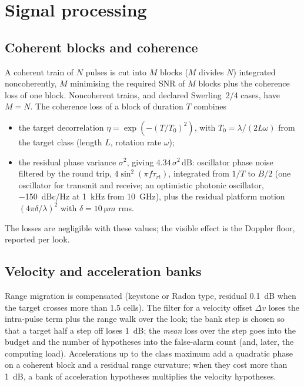 \documentclass[11pt,a4paper]{article}
\newcommand{\dB}{\,\mathrm{dB}}
\begin{document}
\section{Signal processing}\label{sec:proc}

\subsection{Coherent blocks and coherence}
A coherent train of $N$ pulses is cut into $M$ blocks ($M$ divides $N$) integrated noncoherently, $M$ minimising the
required SNR of $M$ blocks plus the coherence loss of one block. Noncoherent trains, and declared Swerling~2/4 cases,
have $M = N$. The coherence loss of a block of duration $T$ combines
\begin{itemize}
  \item the target decorrelation $\eta = \exp(-(T/T_0)^2)$, with $T_0 = \lambda/(2L\omega)$ from the target class
        (length $L$, rotation rate $\omega$);
  \item the residual phase variance $\sigma^2$, giving $4.34\,\sigma^2\dB$: oscillator phase noise filtered by the
        round trip, $4\sin^2(\pi f\tau_{rt})$, integrated from $1/T$ to $B/2$ (one oscillator for transmit and receive;
        an optimistic photonic oscillator, \SI{-150}{dBc/Hz} at \SI{1}{kHz} from \SI{10}{GHz}), plus the residual
        platform motion $(4\pi\delta/\lambda)^2$ with $\delta = \SI{10}{\micro m}$ rms.
\end{itemize}
The losses are negligible with these values; the visible effect is the Doppler floor, reported per look.

\subsection{Velocity and acceleration banks}
Range migration is compensated (keystone or Radon type, residual \SI{0.1}{dB} when the target crosses more than 1.5
cells). The filter for a velocity offset $\Delta v$ loses the intra-pulse term plus the range walk over the look; the
bank step is chosen so that a target half a step off loses \SI{1}{dB}; the \emph{mean} loss over the step goes into the
budget and the number of hypotheses into the false-alarm count (and, later, the computing load). Accelerations up to
the class maximum add a quadratic phase on a coherent block and a residual range curvature; when they cost more than
\SI{1}{dB}, a bank of acceleration hypotheses multiplies the velocity hypotheses.
\end{document}
